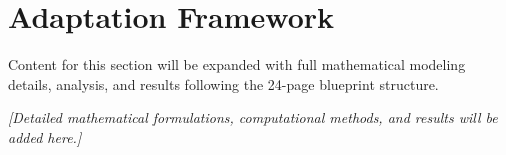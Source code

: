 \section{Adaptation Framework}

Content for this section will be expanded with full mathematical modeling details, analysis, and results following the 24-page blueprint structure.

\vspace{0.5cm}

\noindent \textit{[Detailed mathematical formulations, computational methods, and results will be added here.]}

